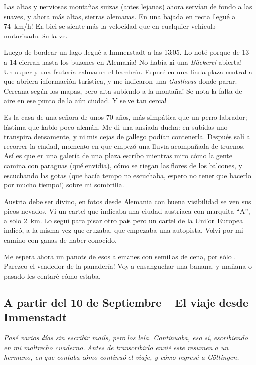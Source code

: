 Las altas y nerviosas monta\~nas suizas (antes lejanas) ahora serv\'ian de
fondo a las suaves, y ahora m\'as altas, sierras alemanas. \textexclamdown En
una bajada en recta llegu\'e a 74~km/h! En bici se siente m\'as la velocidad que
en cualquier veh\'iculo motorizado. Se la ve.

Luego de bordear un lago llegu\'e a Immenstadt a las 13:05. \textexclamdown Lo
not\'e porque de 13 a 14 cierran hasta los buzones en Alemania!
\textexclamdown No hab\'ia ni una \emph{B\"ackerei} abierta! Un super y una
fruter\'ia calmaron el hambr\'in. Esper\'e en una linda plaza central a que
abriera informaci\'on tur\'istica, y me indicaron una \emph{Gasthaus} donde
parar. \textexclamdown Cercana seg\'un los mapas, pero alta subiendo a la
monta\~na! Se nota la falta de aire en ese punto de la a\'un ciudad.
\textexclamdown Y se ve tan cerca!

Es la casa de una se\~nora de unos 70 a\~nos, m\'as simp\'atica que un perro
labrador; l\'astima que hablo poco alem\'an. Me di una ansiada ducha: en
subidas uno transpira densamente, y ni mis cejas de gallego pod\'ian
contenerla. Despu\'es sal\'i a recorrer la ciudad, momento en que empez\'o una
lluvia acompa\~nada de truenos. As\'i es que en una galer\'ia de una plaza
escribo mientras miro c\'omo la gente camina con paraguas (qu\'e envidia),
c\'omo se riegan las flores de los balcones, y escuchando las gotas (que
hac\'ia tempo no escuchaba, \textexclamdown espero no tener que hacerlo por
mucho tiempo!) sobre mi sombrilla.

Austria debe ser divino, en fotos desde Alemania con buena visibilidad se ven
sus picos nevados. Vi un cartel que indicaba una ciudad austriaca con marquita
``A'', a s\'olo 2~km. Lo segu\'i para pisar otro pa\'is pero un cartel de la
Uni'on Europea indic\'o, a la misma vez que cruzaba, que empezaba una autopista.
Volv\'i por mi camino con ganas de haber conocido.

Me espera ahora un panote de esos alemanes con semillas de cena, por s\'olo
. \textexclamdown Parezco el vendedor de la panader\'ia!
Voy a ensanguchar una banana, y ma\~nana o pasado les contar\'e c\'omo estaba.

\subsection*{A partir del 10 de Septiembre -- El viaje desde Immenstadt}

\emph{Pas\'e varios d\'ias sin escribir mails, pero los le\'ia. Continuaba,
eso s\'i, escribiendo en mi maltrecho cuaderno. Antes de transcribirlo envi\'e
este resumen a un hermano, en que contaba c\'omo continu\'o el viaje, y c\'omo
regres\'e a G\"ottingen.}\\

